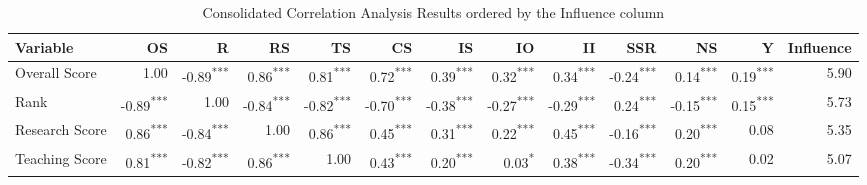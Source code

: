 \documentclass[conference]{IEEEtran}
\begin{document}
\begin{table*}[h!]
	\centering
	\caption{Consolidated Correlation Analysis Results ordered by the Influence column}
	
	\label{tab:correlation_combined}
	\scriptsize
	\begin{tabular}{|l|r|r|r|r|r|r|r|r|r|r|r|r|}
		\hline
		\textbf{Variable} & \textbf{OS} & \textbf{R} & \textbf{RS} & \textbf{TS} & \textbf{CS} & \textbf{IS} & \textbf{IO} & \textbf{II} & \textbf{SSR} & \textbf{NS} & \textbf{Y} & \textbf{Influence} \\
		\hline
		
		Overall Score & \cellcolor{gray!50}1.00 & \cellcolor{gray!44}-0.89\textsuperscript{***} & \cellcolor{gray!42}0.86\textsuperscript{***} & \cellcolor{gray!40}0.81\textsuperscript{***} & \cellcolor{gray!35}0.72\textsuperscript{***} & \cellcolor{gray!19}0.39\textsuperscript{***} & \cellcolor{gray!16}0.32\textsuperscript{***} & \cellcolor{gray!17}0.34\textsuperscript{***} & \cellcolor{gray!12}-0.24\textsuperscript{***} & \cellcolor{gray!07}0.14\textsuperscript{***} & \cellcolor{gray!09}0.19\textsuperscript{***} & 5.90 \\
		
		Rank & \cellcolor{gray!44}-0.89\textsuperscript{***} & \cellcolor{gray!50}1.00 & \cellcolor{gray!42}-0.84\textsuperscript{***} & \cellcolor{gray!41}-0.82\textsuperscript{***} & \cellcolor{gray!35}-0.70\textsuperscript{***} & \cellcolor{gray!19}-0.38\textsuperscript{***} & \cellcolor{gray!13}-0.27\textsuperscript{***} & \cellcolor{gray!14}-0.29\textsuperscript{***} & \cellcolor{gray!12}0.24\textsuperscript{***} & \cellcolor{gray!08}-0.15\textsuperscript{***} & \cellcolor{gray!08}0.15\textsuperscript{***} & 5.73 \\
		
		Research Score & \cellcolor{gray!42}0.86\textsuperscript{***} & \cellcolor{gray!42}-0.84\textsuperscript{***} & \cellcolor{gray!50}1.00 & \cellcolor{gray!42}0.86\textsuperscript{***} & \cellcolor{gray!22}0.45\textsuperscript{***} & \cellcolor{gray!16}0.31\textsuperscript{***} & \cellcolor{gray!11}0.22\textsuperscript{***} & \cellcolor{gray!22}0.45\textsuperscript{***} & \cellcolor{gray!08}-0.16\textsuperscript{***} & \cellcolor{gray!10}0.20\textsuperscript{***} & \cellcolor{gray!04}0.08 & 5.35 \\
		
		Teaching Score & \cellcolor{gray!40}0.81\textsuperscript{***} & \cellcolor{gray!41}-0.82\textsuperscript{***} & \cellcolor{gray!42}0.86\textsuperscript{***} & \cellcolor{gray!50}1.00 & \cellcolor{gray!21}0.43\textsuperscript{***} & \cellcolor{gray!10}0.20\textsuperscript{***} & \cellcolor{gray!02}0.03\textsuperscript{*} & \cellcolor{gray!19}0.38\textsuperscript{***} & \cellcolor{gray!17}-0.34\textsuperscript{***} & \cellcolor{gray!10}0.20\textsuperscript{***} & \cellcolor{gray!01}0.02 & 5.07 \\
		

\end{tabular}
\end{table*}
\end{document}
